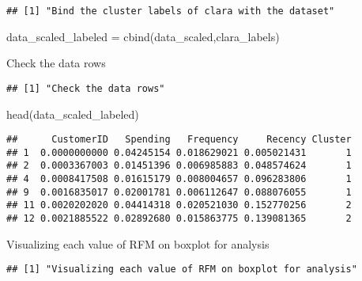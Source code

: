 \documentclass[
]{article}
\newenvironment{Shaded}{\begin{snugshade}}{\end{snugshade}}
\newcommand{\AttributeTok}[1]{\textcolor[rgb]{0.77,0.63,0.00}{#1}}
\newcommand{\FunctionTok}[1]{\textcolor[rgb]{0.00,0.00,0.00}{#1}}
\newcommand{\NormalTok}[1]{#1}
\newcommand{\OtherTok}[1]{\textcolor[rgb]{0.56,0.35,0.01}{#1}}
\newcommand{\SpecialCharTok}[1]{\textcolor[rgb]{0.00,0.00,0.00}{#1}}
\newcommand{\StringTok}[1]{\textcolor[rgb]{0.31,0.60,0.02}{#1}}
\begin{document}
\begin{verbatim}
## [1] "Bind the cluster labels of clara with the dataset"
\end{verbatim}

\begin{Shaded}
\begin{Highlighting}[]
\NormalTok{data\_scaled\_labeled }\OtherTok{=} \FunctionTok{cbind}\NormalTok{(data\_scaled,clara\_labels)}

\StringTok{\textquotesingle{}Check the data rows\textquotesingle{}}
\end{Highlighting}
\end{Shaded}

\begin{verbatim}
## [1] "Check the data rows"
\end{verbatim}

\begin{Shaded}
\begin{Highlighting}[]
\FunctionTok{head}\NormalTok{(data\_scaled\_labeled)}
\end{Highlighting}
\end{Shaded}

\begin{verbatim}
##      CustomerID   Spending   Frequency     Recency Cluster
## 1  0.0000000000 0.04245154 0.018629021 0.005021431       1
## 2  0.0003367003 0.01451396 0.006985883 0.048574624       1
## 4  0.0008417508 0.01615179 0.008004657 0.096283806       1
## 9  0.0016835017 0.02001781 0.006112647 0.088076055       1
## 11 0.0020202020 0.04414318 0.020521030 0.152770256       2
## 12 0.0021885522 0.02892680 0.015863775 0.139081365       2
\end{verbatim}

\begin{Shaded}
\begin{Highlighting}[]
\StringTok{\textquotesingle{}Visualizing each value of RFM on boxplot for analysis\textquotesingle{}}
\end{Highlighting}
\end{Shaded}

\begin{verbatim}
## [1] "Visualizing each value of RFM on boxplot for analysis"
\end{verbatim}

\begin{Shaded}
\end{Shaded}
\end{document}
